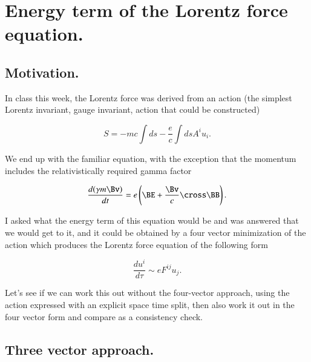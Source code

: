%
%

\chapter{Energy term of the Lorentz force equation.}
\label{chap:lorentzForceHamiltonian}
{}
\date{Feb 6, 2011}

\beginArtWithToc

\section{Motivation.}

In class this week, the Lorentz force was derived from an action (the simplest Lorentz invariant, gauge invariant, action that could be constructed)

\begin{equation}\label{eqn:lorentzForceHamiltonian:10}
S = - m c \int ds - \frac{e}{c} \int ds A^i u_i.
\end{equation}

We end up with the familiar equation, with the exception that the momentum includes the relativistically required gamma factor

\begin{equation}\label{eqn:lorentzForceHamiltonian:20}
\frac{d (\gamma m \Bv)}{dt} = e \left( \BE + \frac{\Bv}{c} \cross \BB \right).
\end{equation}

I asked what the energy term of this equation would be and was answered that we would get to it, and it could be obtained by a four vector minimization of the action which produces the Lorentz force equation of the following form

\begin{equation}\label{eqn:lorentzForceHamiltonian:30}
\frac{du^i}{d\tau} \sim e F^{ij} u_j.
\end{equation}

Let's see if we can work this out without the four-vector approach, using the action expressed with an explicit space time split, then also work it out in the four vector form and compare as a consistency check.

\section{Three vector approach.}
